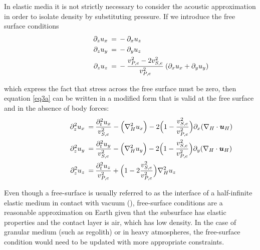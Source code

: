 \documentclass{article}
\begin{document}
	In elastic media it is not strictly necessary to consider the acoustic approximation in order to isolate density by substituting pressure. If we introduce the free surface conditions
	\begin{align}\shoveright \shoveright \shoveright \shoveright \shoveright \shoveright 
		\partial_{z} u_{x} \: =& \: - \partial_{x} u_{z}\label{eq:FS_cond1}\\ 
		\partial_{z} u_{y} \: =& \: - \partial_{y} u_{z} \label{eq:FS_cond2}\\
		\partial_{z} u_{z} \: =& \: - \frac{v_{P,e}^{2} - 2v_{S,e}^{2}}{v_{P,e}^{2}} \: (\partial_{x} u_{x} + \partial_{y} u_{y})
		\label{eq:FS_cond3}
	\end{align}
	
	which express the fact that stress across the free surface must be zero, then equation \eqref{eq3a} can be written in a modified form that is valid at the free surface and in the absence of body forces:	
	\begin{align}\shoveright \shoveright \shoveright \shoveright \shoveright \shoveright 
		\partial_{z}^{2} u_{x} \: =& \: \frac{\partial_{t}^{2} u_{x} }{v_{S,e}^{2}} - \Big(\nabla_{H}^{2}u_{x} \Big) - 2\Big(1-\frac{v_{S,e}^{2}}{v_{P,e}^{2}} \Big) \partial_{x} (\nabla_{H} \cdot \bm{u}_{H})\label{eq:FS_eq2a_1} \\ 
		\partial_{z}^{2} u_{y} \: =& \: \frac{\partial_{t}^{2} u_{y} }{v_{S,e}^{2}} - \Big(\nabla_{H}^{2}u_{y}  \Big) - 2\Big(1-\frac{v_{S,e}^{2}}{v_{P,e}^{2}} \Big) \partial_{y} (\nabla_{H} \cdot \bm{u}_{H})\label{eq:FS_eq2a_2}\\
		\partial_{z}^{2} u_{z} \: =& \: \frac{\partial_{t}^{2} u_{z} }{v_{P,e}^{2}} + \Big(1-2\frac{v_{S,e}^{2}}{v_{P,e}^{2}} \Big) \nabla^{2}_{H}u_{z}
		\label{eq:FS_eq2a_3}
	\end{align}
	
	Even though a free-surface is usually referred to as the interface of a half-infinite elastic medium in contact with vacuum (\cite{robertsson1995comparative}), free-surface conditions are a reasonable approximation on Earth given that the subsurface has elastic properties and the contact layer is air, which has low density. In the case of granular medium (such as regolith) or in heavy atmospheres, the free-surface condition would need to be updated with more appropriate constraints.\\
	
\end{document}
